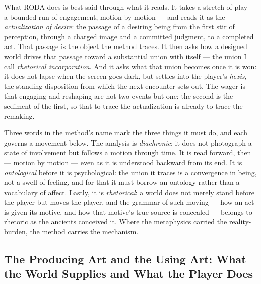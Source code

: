 \documentclass{article}
\begin{document}
What RODA does is best said through what it reads. It takes a stretch of play — a bounded run of engagement, motion by motion — and reads it as the \textit{actualization of desire}: the passage of a desiring being from the first stir of perception, through a charged image and a committed judgment, to a completed act. That passage is the object the method traces. It then asks how a designed world drives that passage toward a substantial union with itself — the union I call \textit{rhetorical incorporation}. And it asks what that union becomes once it is won: it does not lapse when the screen goes dark, but settles into the player's \textit{hexis}, the standing disposition from which the next encounter sets out. The wager is that engaging and reshaping are not two events but one: the second is the sediment of the first, so that to trace the actualization is already to trace the remaking.

Three words in the method's name mark the three things it must do, and each governs a movement below. The analysis is \textit{diachronic}: it does not photograph a state of involvement but follows a motion through time. It is read forward, then — motion by motion — even as it is understood backward from its end. It is \textit{ontological} before it is psychological: the union it traces is a convergence in being, not a swell of feeling, and for that it must borrow an ontology rather than a vocabulary of affect. Lastly, it is \textit{rhetorical}: a world does not merely stand before the player but moves the player, and the grammar of such moving — how an act is given its motive, and how that motive's true source is concealed — belongs to rhetoric as the ancients conceived it. Where the metaphysics carried the reality-burden, the method carries the mechanism.

\subsection*{The Producing Art and the Using Art: What the World Supplies and What the Player Does}
\end{document}
